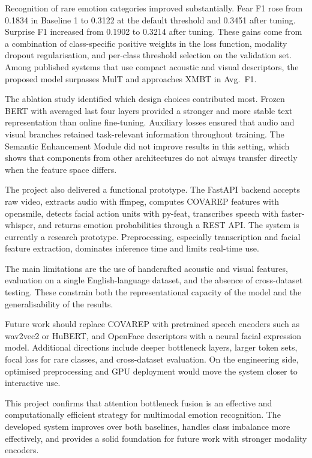 Recognition of rare emotion categories improved substantially. Fear F1 rose from 0.1834 in Baseline 1 to 0.3122 at the default threshold and 0.3451 after tuning. Surprise F1 increased from 0.1902 to 0.3214 after tuning. These gains come from a combination of class-specific positive weights in the loss function, modality dropout regularisation, and per-class threshold selection on the validation set. Among published systems that use compact acoustic and visual descriptors, the proposed model surpasses MulT and approaches XMBT in Avg.~F1.

The ablation study identified which design choices contributed most. Frozen BERT with averaged last four layers provided a stronger and more stable text representation than online fine-tuning. Auxiliary losses ensured that audio and visual branches retained task-relevant information throughout training. The Semantic Enhancement Module did not improve results in this setting, which shows that components from other architectures do not always transfer directly when the feature space differs.

The project also delivered a functional prototype. The FastAPI backend accepts raw video, extracts audio with ffmpeg, computes COVAREP features with opensmile, detects facial action units with py-feat, transcribes speech with faster-whisper, and returns emotion probabilities through a REST API. The system is currently a research prototype. Preprocessing, especially transcription and facial feature extraction, dominates inference time and limits real-time use.

The main limitations are the use of handcrafted acoustic and visual features, evaluation on a single English-language dataset, and the absence of cross-dataset testing. These constrain both the representational capacity of the model and the generalisability of the results.

Future work should replace COVAREP with pretrained speech encoders such as wav2vec2 or HuBERT, and OpenFace descriptors with a neural facial expression model. Additional directions include deeper bottleneck layers, larger token sets, focal loss for rare classes, and cross-dataset evaluation. On the engineering side, optimised preprocessing and GPU deployment would move the system closer to interactive use.

This project confirms that attention bottleneck fusion is an effective and computationally efficient strategy for multimodal emotion recognition. The developed system improves over both baselines, handles class imbalance more effectively, and provides a solid foundation for future work with stronger modality encoders.